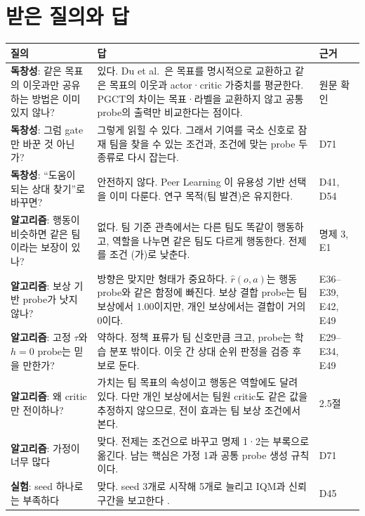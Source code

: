 \documentclass[11pt]{article}
\begin{document}
\section{받은 질의와 답}

\begin{xltabular}{\textwidth}{>{\raggedright\arraybackslash}p{4.2cm} L >{\raggedright\arraybackslash}p{2.6cm}}
\toprule
질의 & 답 & 근거 \\
\midrule
\endhead
\textbf{독창성}: 같은 목표의 이웃과만 공유하는 방법은 이미 있지 않나? & 있다. Du et al.\ \cite{du2025}은 목표를 명시적으로 교환하고 같은 목표의 이웃과 actor·critic 가중치를 평균한다. PGCT의 차이는 목표·라벨을 교환하지 않고 공통 probe의 출력만 비교한다는 점이다. & 원문 확인 \\
\textbf{독창성}: 그럼 gate만 바꾼 것 아닌가? & 그렇게 읽힐 수 있다. 그래서 기여를 국소 신호로 잠재 팀을 찾을 수 있는 조건과, 조건에 맞는 probe 두 종류로 다시 잡는다. & D71 \\
\textbf{독창성}: ``도움이 되는 상대 찾기''로 바꾸면? & 안전하지 않다. Peer Learning \cite{derstroff2024}이 유용성 기반 선택을 이미 다룬다. 연구 목적(팀 발견)은 유지한다. & D41, D54 \\
\textbf{알고리즘}: 행동이 비슷하면 같은 팀이라는 보장이 있나? & 없다. 팀 기준 관측에서는 다른 팀도 똑같이 행동하고, 역할을 나누면 같은 팀도 다르게 행동한다. 전제를 조건 (가)로 낮춘다. & 명제 3, E1 \\
\textbf{알고리즘}: 보상 기반 probe가 낫지 않나? & 방향은 맞지만 형태가 중요하다. $\hat r(o,a)$는 행동 probe와 같은 함정에 빠진다. 보상 결합 probe는 팀 보상에서 1.00이지만, 개인 보상에서는 결합이 거의 0이다. & E36--E39, E42, E49 \\
\textbf{알고리즘}: 고정 $\tau$와 $h{=}0$ probe는 믿을 만한가? & 약하다. 정책 표류가 팀 신호만큼 크고, probe는 학습 분포 밖이다. 이웃 간 상대 순위 판정을 검증 후보로 둔다. & E29--E34, E49 \\
\textbf{알고리즘}: 왜 critic만 전이하나? & 가치는 팀 목표의 속성이고 행동은 역할에도 달려 있다. 다만 개인 보상에서는 팀원 critic도 같은 값을 추정하지 않으므로, 전이 효과는 팀 보상 조건에서 본다. & 2.5절 \\
\textbf{알고리즘}: 가정이 너무 많다 & 맞다. 전제는 조건으로 바꾸고 명제 1·2는 부록으로 옮긴다. 남는 핵심은 가정 1과 공통 probe 생성 규칙이다. & D71 \\
\textbf{실험}: seed 하나로는 부족하다 & 맞다. seed 3개로 시작해 5개로 늘리고 IQM과 신뢰구간을 보고한다 \cite{agarwal2021}. & D45 \\

\end{xltabular}
\end{document}
